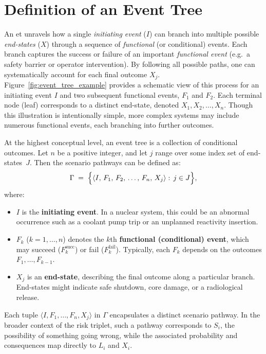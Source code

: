 \section{Definition of an Event Tree}
\label{sec:event_tree_definition}

An \acrfull{et} unravels how a single \emph{initiating event} (\(I\)) can branch into multiple possible \emph{end-states} (\(X\)) through a sequence of \emph{functional} (or conditional) events. Each branch captures the success or failure of an important \emph{functional event} (e.g.\ a safety barrier or operator intervention). By following all possible paths, one can systematically account for each final outcome \(X_j\). Figure~\ref{fig:event_tree_example} provides a schematic view of this process for an initiating event \(I\) and two subsequent functional events, \(F_1\) and \(F_2\). Each terminal node (leaf) corresponds to a distinct end-state, denoted \(X_1, X_2, \ldots, X_n\). Though this illustration is intentionally simple, more complex systems may include numerous functional events, each branching into further outcomes.




At the highest conceptual level, an event tree is a collection of conditional outcomes. Let \(n\) be a positive integer, and let \(j\) range over some index set of end-states~\(J\). Then the scenario pathways can be defined as:
\begin{equation}
\label{eq:event_tree_gamma}
    \Gamma
    \;=\;
    \Bigl\{
        \langle
            I,\,
            F_1,\,
            F_2,\,
            \dots,\,
            F_n,\,
            X_j
        \rangle
        :\,
        j \in J
    \Bigr\},
\end{equation}
where:
\begin{itemize}
    \item \(I\) is the \textbf{initiating event}. In a nuclear system, this could be an abnormal occurrence such as a coolant pump trip or an unplanned reactivity insertion.
    \item \(F_k\) (\(k=1,\ldots,n\)) denotes the \(k\)th \textbf{functional (conditional) event}, which may succeed (\(F_k^{\text{succ}}\)) or fail (\(F_k^{\text{fail}}\)). Typically, each \(F_k\) depends on the outcomes \(F_1,\ldots,F_{k-1}\).
    \item \(X_j\) is an \textbf{end-state}, describing the final outcome along a particular branch. End-states might indicate safe shutdown, core damage, or a radiological release.
\end{itemize}
Each tuple \(\langle I, F_1, \dots, F_n, X_j\rangle\) in \(\Gamma\) encapsulates a distinct scenario pathway. In the broader context of the risk triplet, such a pathway corresponds to \(S_i\), the possibility of something going wrong, while the associated probability and consequences map directly to \(L_i\) and \(X_i\).